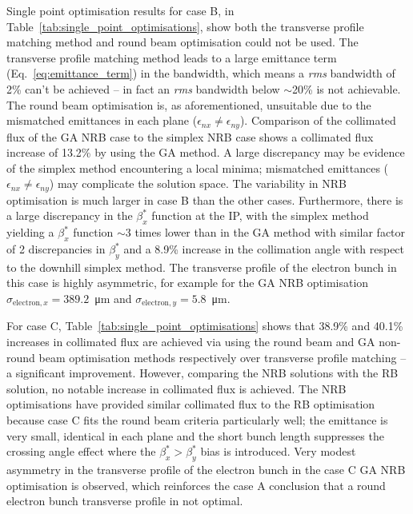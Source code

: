 \documentclass[../main.tex]{subfiles}
\begin{document}
Single point optimisation results for case B, in Table~\ref{tab:single_point_optimisations}, show both the transverse profile matching method and round beam optimisation could not be used. The transverse profile matching method leads to a large emittance term (Eq.~\ref{eq:emittance_term}) in the bandwidth, which means a \textit{rms} bandwidth of 2\% can't be achieved -- in fact an \textit{rms} bandwidth below $\sim$20\% is not achievable. The round beam optimisation is, as aforementioned, unsuitable due to the mismatched emittances in each plane ($\epsilon_{nx}\neq\epsilon_{ny}$). Comparison of the collimated flux of the GA NRB case to the simplex NRB case shows a collimated flux increase of 13.2\% by using the GA method. A large discrepancy may be evidence of the simplex method encountering a local minima; mismatched emittances ($\epsilon_{nx}\neq\epsilon_{ny}$) may complicate the solution space. The variability in NRB optimisation is much larger in case B than the other cases. Furthermore, there is a large discrepancy in the $\beta_{x}^{*}$ function at the IP, with the simplex method yielding a $\beta_{x}^{*}$ function $\sim3$ times lower than in the GA method with similar factor of 2 discrepancies in $\beta_{y}^{*}$ and a 8.9\% increase in the collimation angle with respect to the downhill simplex method. The transverse profile of the electron bunch in this case is highly asymmetric, for example for the GA NRB optimisation $\sigma_{\mathrm{electron},x} = 389.2$~\si{\micro\meter} and $\sigma_{\mathrm{electron},y} = 5.8$~\si{\micro\meter}.

For case C, Table~\ref{tab:single_point_optimisations} shows that 38.9\% and 40.1\% increases in collimated flux are achieved via using the round beam and GA non-round beam optimisation methods respectively over transverse profile matching -- a significant improvement. However, comparing the NRB solutions with the RB solution, no notable increase in collimated flux is achieved. The NRB optimisations have provided similar collimated flux to the RB optimisation because case C fits the round beam criteria particularly well; the emittance is very small, identical in each plane and the short bunch length suppresses the crossing angle effect where the $\beta_{x}^{*} > \beta_{y}^{*}$ bias is introduced. Very modest asymmetry in the transverse profile of the electron bunch in the case C GA NRB optimisation is observed, which reinforces the case A conclusion that a round electron bunch transverse profile in not optimal.      
\end{document}

